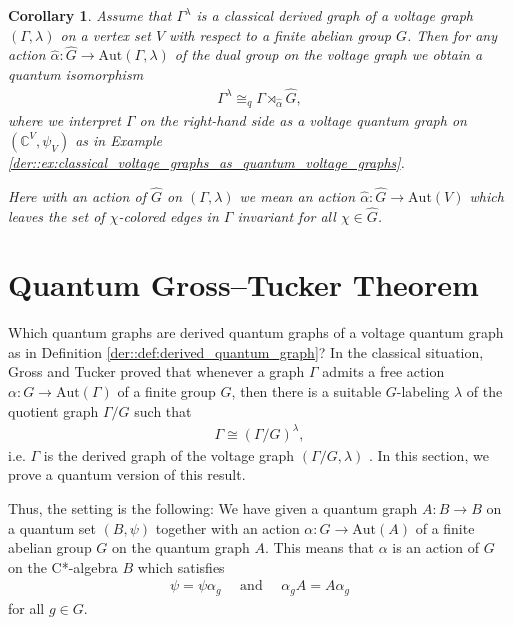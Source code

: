 \documentclass{amsart}
\newcommand{\C}{\mathbb{C}}
\newtheorem{corollary}[thm]{Corollary}
\theoremstyle{definition}
\theoremstyle{definition}
\begin{document}
\begin{corollary}
    \label{qiso::cor:quantum_isomorphism_between_classical_derived_graph_and_quantum_graph}
    Assume that $\Gamma^\lambda$ is a classical derived graph of a voltage graph $(\Gamma, \lambda)$ on a vertex set $V$ with respect to a finite abelian group $G$. Then for any action $\hat{\alpha}: \hat{G} \to \mathrm{Aut}(\Gamma, \lambda)$ of the dual group on the voltage graph we obtain a quantum isomorphism
    \begin{align*}
        \Gamma^\lambda \cong_q \Gamma \rtimes_{\hat{\alpha}} \hat{G},
    \end{align*}
    where we interpret $\Gamma$ on the right-hand side as a voltage quantum graph on $(\C^V, \psi_V)$ as in Example \ref{der::ex:classical_voltage_graphs_as_quantum_voltage_graphs}.

    Here with an action of $\hat{G}$ on $(\Gamma, \lambda)$ we mean an action $\hat{\alpha}: \hat{G} \to \mathrm{Aut}(V)$ which leaves the set of $\chi$-colored edges in $\Gamma$ invariant for all $\chi \in \hat{G}$.
\end{corollary}

\section{Quantum Gross--Tucker Theorem}
\label{sec::qgross_tucker}

Which quantum graphs are derived quantum graphs of a voltage quantum graph as in Definition \ref{der::def:derived_quantum_graph}?
In the classical situation, Gross and Tucker proved that whenever a graph $\Gamma$ admits a free action $\alpha: G \to \mathrm{Aut}(\Gamma)$ of a finite group $G$, then there is a suitable $G$-labeling $\lambda$ of the quotient graph $\Gamma / G$ such that
\begin{align*}
    \Gamma \cong (\Gamma / G)^\lambda,
\end{align*}
i.e. $\Gamma$ is the derived graph of the voltage graph $(\Gamma / G, \lambda)$ \cite[Theorem 2.2.2]{gross_topological_1987}.
In this section, we prove a quantum version of this result.

Thus, the setting is the following: We have given a quantum graph $A: B \to B$ on a quantum set $(B, \psi)$ together with an action $\alpha: G \to \mathrm{Aut}(A)$ of a finite abelian group $G$ on the quantum graph $A$. This means that $\alpha$ is an action of $G$ on the C*-algebra $B$ which satisfies
\begin{align*}
    \psi = \psi \alpha_g 
    \quad \text{ and } \quad
    \alpha_g A = A \alpha_g
\end{align*}
for all $g \in G$.
\end{document}
